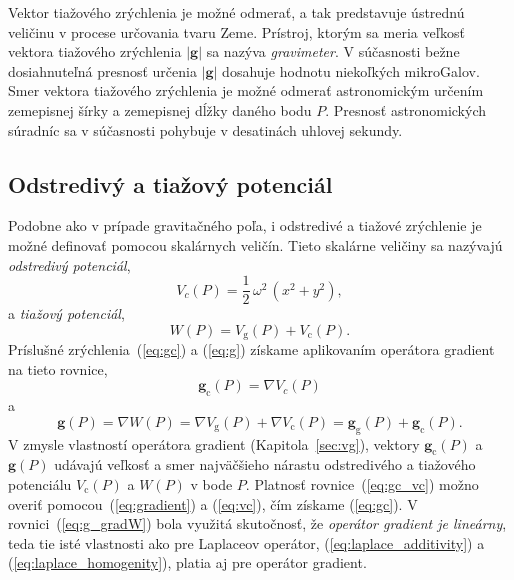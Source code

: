 \documentclass[a4paper, 12pt]{book}
\newcommand{\gidx}{\mathrm g}
\newcommand{\cidx}{\mathrm c}
\let\vec\mathbf
\begin{document}
Vektor tiažového zrýchlenia je možné odmerať, a tak predstavuje ústrednú 
veličinu v procese určovania tvaru Zeme.  Prístroj, ktorým sa meria veľkosť 
vektora tiažového zrýchlenia $| \vec g |$ sa nazýva \emph{gravimeter}.  
V súčasnosti bežne dosiahnuteľná presnosť určenia $| \vec g |$ dosahuje hodnotu 
niekoľkých mikroGalov.  Smer vektora tiažového zrýchlenia je možné odmerať 
astronomickým určením zemepisnej šírky a zemepisnej dĺžky daného bodu $P$.  
Presnosť astronomických súradníc sa v súčasnosti pohybuje v desatinách uhlovej 
sekundy.






\subsection{Odstredivý a tiažový potenciál}

Podobne ako v prípade gravitačného poľa, i odstredivé a tiažové zrýchlenie je 
možné definovať pomocou skalárnych veličín.  Tieto skalárne veličiny sa 
nazývajú \emph{odstredivý potenciál},
%
\begin{equation}
\label{eq:vc}
V_c(P) = \frac{1}{2} \, \omega^2 \, (x^2 + y^2){,}
\end{equation}
%
a \emph{tiažový potenciál},
%
\begin{equation}
\label{eq:w}
W(P) = V_\gidx(P) + V_\cidx(P){.}
\end{equation}
%
Príslušné zrýchlenia~(\ref{eq:gc}) a (\ref{eq:g}) získame aplikovaním operátora 
gradient na tieto rovnice,
%
\begin{equation}
\label{eq:gc_vc}
\vec g_\cidx(P) = \nabla V_c(P)
\end{equation}
%
a
%
\begin{equation}
\label{eq:g_gradW}
\vec g(P) = \nabla W(P) = \nabla V_\gidx(P) + \nabla V_\cidx(P) = \vec 
g_\gidx(P) + \vec g_\cidx(P){.}
\end{equation}
%
V zmysle vlastností operátora gradient (Kapitola~\ref{sec:vg}), vektory $\vec 
g_\cidx(P)$ a $\vec g(P)$ udávajú veľkosť a smer najväčšieho nárastu 
odstredivého a tiažového potenciálu $V_\cidx(P)$ a $W(P)$ v bode $P$.  Platnosť 
rovnice~(\ref{eq:gc_vc}) možno overiť pomocou~(\ref{eq:gradient}) 
a (\ref{eq:vc}), čím získame (\ref{eq:gc}).  V rovnici~(\ref{eq:g_gradW}) bola 
využitá skutočnosť, že \emph{operátor gradient je lineárny}, teda tie isté 
vlastnosti ako pre Laplaceov operátor, (\ref{eq:laplace_additivity}) 
a (\ref{eq:laplace_homogenity}), platia aj pre operátor gradient.
\end{document}
